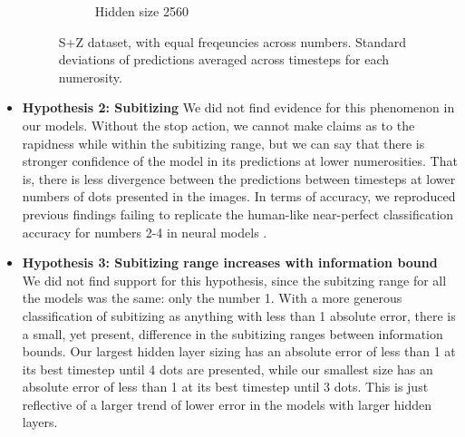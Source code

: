 \documentclass{article}
\begin{document}
\begin{itemize}
\begin{figure}[H]
\begin{subfigure}{0.3\textwidth}
    \caption{Hidden size 2560}
    \label{fig:3b}
  \end{subfigure}
  \caption{S+Z dataset, with equal freqeuncies across numbers. Standard deviations of predictions averaged across timesteps for each numerosity.}
  \label{fig:images-a}
\end{figure}
    \item \textbf{Hypothesis 2: Subitizing}\newline
    We did not find evidence for this phenomenon in our models.\newline
    Without the stop action, we cannot make claims as to the rapidness while within the subitizing range, but we can say that there is stronger confidence of the model in its predictions at lower numerosities. That is, there is less divergence between the predictions between timesteps at lower numbers of dots presented in the images. \newline
    In terms of accuracy, we reproduced previous findings failing to replicate the human-like near-perfect classification accuracy for numbers 2-4 in neural models \cite{mcclelland}.
    
    \item \textbf{Hypothesis 3: Subitizing range increases with information bound}\newline
    We did not find support for this hypothesis, since the subitzing range for all the models was the same: only the number 1. \newline
    With a more generous classification of subitizing as anything with less than 1 absolute error, there is a small, yet present, difference in the subitizing ranges between information bounds. Our largest hidden layer sizing has an absolute error of less than 1 at its best timestep until 4 dots are presented, while our smallest size has an absolute error of less than 1 at its best timestep until 3 dots. This is just reflective of a larger trend of lower error in the models with larger hidden layers.
    

\end{itemize}
\end{document}
